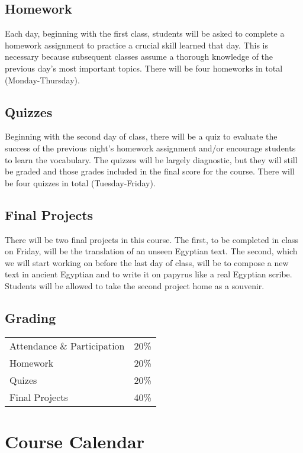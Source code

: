 \documentclass[11pt]{article}
\begin{document}
		\subsection*{Homework}
			Each day, beginning with the first class, students will be asked to complete a homework assignment to practice a crucial skill learned that day.
				This is necessary because subsequent classes assume a thorough knowledge of the previous day's most important topics.
			There will be four homeworks in total (Monday-Thursday).
			
		\subsection*{Quizzes}
			Beginning with the second day of class, there will be a quiz to evaluate the success of the previous night's homework assignment 
			and/or encourage students to learn the vocabulary.
			The quizzes will be largely diagnostic, but they will still be graded and those grades included in the final score for the course.
			There will be four quizzes in total (Tuesday-Friday).
			
		\subsection*{Final Projects}
			There will be two final projects in this course.
			The first, to be completed in class on Friday, will be the translation of an unseen Egyptian text.
			The second, which we will start working on before the last day of class, 
			will be to compose a new text in ancient Egyptian
			 and to write it on papyrus like a real Egyptian scribe. 
			Students will be allowed to take the second project home as a souvenir.
			
			
		\subsection*{Grading}
			\begin{tabular}{l l}
				Attendance \& Participation & 20\% \\
				Homework & 20\% \\
				Quizes & 20\% \\
				Final Projects & 40\% \\
			\end{tabular}
	
	\section*{Course Calendar}
	
\end{document}
